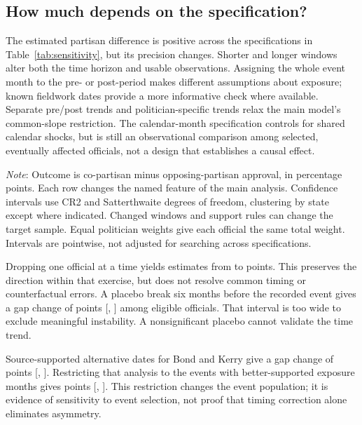 \documentclass[11pt]{article}
\newcommand{\TableStyle}{\small\setlength{\tabcolsep}{5pt}\renewcommand{\arraystretch}{1.12}}
\begin{document}
\subsection{How much depends on the specification?}

The estimated partisan difference is positive across the specifications in Table~\ref{tab:sensitivity}, but its precision changes. Shorter and longer windows alter both the time horizon and usable observations. Assigning the whole event month to the pre- or post-period makes different assumptions about exposure; known fieldwork dates provide a more informative check where available. Separate pre/post trends and politician-specific trends relax the main model's common-slope restriction. The calendar-month specification controls for shared calendar shocks, but is still an observational comparison among selected, eventually affected officials, not a design that establishes a causal effect.

\begin{table}[htbp]
\centering\TableStyle
\caption{Sensitivity of the estimated partisan difference.}
\label{tab:sensitivity}
\begin{minipage}{\linewidth}\footnotesize
\emph{Note}: Outcome is co-partisan minus opposing-partisan approval, in percentage points. Each row changes the named feature of the main analysis. Confidence intervals use CR2 and Satterthwaite degrees of freedom, clustering by state except where indicated. Changed windows and support rules can change the target sample. Equal politician weights give each official the same total weight. Intervals are pointwise, not adjusted for searching across specifications.
\end{minipage}
\end{table}

Dropping one official at a time yields estimates from \LooMin{} to \LooMax{} points. This preserves the direction within that exercise, but does not resolve common timing or counterfactual errors. A placebo break six months before the recorded event gives a gap change of \PlaceboEstimate{} points [\PlaceboLower, \PlaceboUpper] among \PlaceboOfficials{} eligible officials. That interval is too wide to exclude meaningful instability. A nonsignificant placebo cannot validate the time trend.

Source-supported alternative dates for Bond and Kerry give a gap change of \CorrectedEstimate{} points [\CorrectedLower, \CorrectedUpper]. Restricting that analysis to the \SupportedOfficials{} events with better-supported exposure months gives \SupportedEstimate{} points [\SupportedLower, \SupportedUpper]. This restriction changes the event population; it is evidence of sensitivity to event selection, not proof that timing correction alone eliminates asymmetry.
\end{document}
